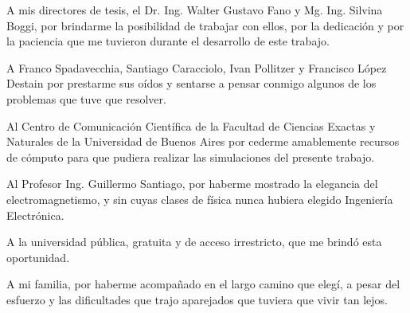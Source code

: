 A mis directores de tesis, el Dr. Ing. Walter Gustavo Fano y Mg. Ing. Silvina Boggi, por brindarme la posibilidad de trabajar con ellos, por la dedicación y por la paciencia que me tuvieron durante el desarrollo de este trabajo.

A Franco Spadavecchia, Santiago Caracciolo, Ivan Pollitzer y Francisco López Destain por prestarme sus oídos y sentarse a pensar conmigo algunos de los problemas que tuve que resolver.

Al Centro de Comunicación Científica de la Facultad de Ciencias Exactas y Naturales de la Universidad de Buenos Aires por cederme amablemente recursos de cómputo para que pudiera realizar las simulaciones del presente trabajo.

Al Profesor Ing. Guillermo Santiago, por haberme mostrado la elegancia del electromagnetismo, y sin cuyas clases de física nunca hubiera elegido Ingeniería Electrónica.

A la universidad pública, gratuita y de acceso irrestricto, que me brindó esta oportunidad.

A mi familia, por haberme acompañado en el largo camino que elegí, a pesar del esfuerzo y las dificultades que trajo aparejados que tuviera que vivir tan lejos.